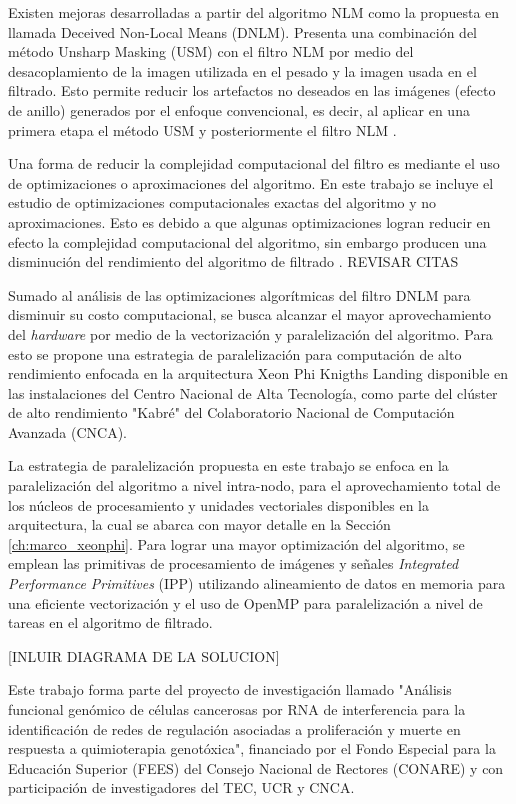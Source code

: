 Existen mejoras desarrolladas a partir del algoritmo NLM como la propuesta en \cite{calderon2015dewaff} llamada Deceived Non-Local Means (DNLM). Presenta una combinaci\'on del m\'etodo Unsharp Masking (USM) con el filtro NLM por medio del desacoplamiento de la imagen utilizada en el pesado y la imagen usada en el filtrado. Esto permite reducir los artefactos no deseados en las im\'agenes (efecto de anillo) generados por el enfoque convencional, es decir, al aplicar en una primera etapa el m\'etodo USM y posteriormente el filtro NLM \cite{calderon2015dewaff}.  


Una forma de reducir la complejidad computacional del filtro es mediante el uso de optimizaciones o aproximaciones del algoritmo. En este trabajo se incluye el estudio de optimizaciones computacionales exactas del algoritmo y no aproximaciones. Esto es debido a que algunas optimizaciones logran reducir en efecto la complejidad computacional del algoritmo, sin embargo producen una disminuci\'on del rendimiento del algoritmo de filtrado \cite{Orchard2008,Tasdizen2009}. REVISAR CITAS

Sumado al an\'alisis de las optimizaciones algor\'itmicas del filtro DNLM para disminuir su costo computacional, se busca alcanzar el mayor aprovechamiento del \textit{hardware} por medio de la vectorizaci\'on y paralelizaci\'on del algoritmo. Para esto se propone una estrategia de paralelizaci\'on para computaci\'on de alto rendimiento enfocada en la arquitectura Xeon Phi Knigths Landing disponible en las instalaciones del Centro Nacional de Alta Tecnolog\'ia, como parte del cl\'uster de alto rendimiento "Kabr\'e" del Colaboratorio Nacional de Computaci\'on Avanzada (CNCA).

La estrategia de paralelizaci\'on propuesta en este trabajo se enfoca en la paralelizaci\'on del algoritmo a nivel intra-nodo, para el aprovechamiento total de los n\'ucleos de procesamiento y unidades vectoriales disponibles en la arquitectura, la cual se abarca con mayor detalle en la Secci\'on \ref{ch:marco_xeonphi}. Para lograr una mayor optimizaci\'on del algoritmo, se emplean las primitivas de procesamiento de im\'agenes y se\~nales \textit{Integrated Performance Primitives} (IPP) utilizando alineamiento de datos en memoria para una eficiente vectorizaci\'on y el uso de OpenMP para paralelizaci\'on a nivel de tareas en el algoritmo de filtrado. 


[INLUIR DIAGRAMA DE LA SOLUCION]

Este trabajo forma parte del proyecto de investigaci\'on llamado "Análisis funcional genómico de células cancerosas por RNA de interferencia para la identificación de redes de regulación asociadas a proliferación y muerte en respuesta a quimioterapia genotóxica", financiado por el Fondo Especial para la Educaci\'on Superior (FEES) del Consejo Nacional de Rectores (CONARE) y con participaci\'on de investigadores del TEC, UCR y CNCA. 



